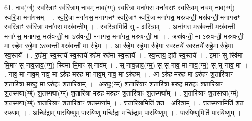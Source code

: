 \documentclass[17pt]{extarticle}
\begin{document}
61. नाव(ग्ग्॑) स्वरि॒त्राꣳ स्व॑रि॒त्राम् नाव॒म् नाव(ग्ग्॑) स्वरि॒त्रा मना॑गस॒ मना॑गसꣳ स्वरि॒त्राम् नाव॒म् नाव(ग्ग्॑) स्वरि॒त्रा मना॑गसम् । . स्व॒रि॒त्रा मना॑गस॒ मना॑गसꣳ स्वरि॒त्राꣳ स्व॑रि॒त्रा मना॑गस॒ मस्र॑वन्ती॒ मस्र॑वन्ती॒ मना॑गसꣳ स्वरि॒त्राꣳ स्व॑रि॒त्रा मना॑गस॒ मस्र॑वन्तीम् । . स्व॒रि॒त्रामिति॑ सु - अ॒रि॒त्राम् । . अना॑गस॒ मस्र॑वन्ती॒ मस्र॑वन्ती॒ मना॑गस॒ मना॑गस॒ मस्र॑वन्ती॒ मा ऽस्र॑वन्ती॒ मना॑गस॒ मना॑गस॒ मस्र॑वन्ती॒ मा । . अस्र॑वन्ती॒ मा ऽस्र॑वन्ती॒ मस्र॑वन्ती॒ मा रु॑हेम रुहे॒मा ऽस्र॑वन्ती॒ मस्र॑वन्ती॒ मा रु॑हेम । . आ रु॑हेम रुहे॒मा रु॑हेमा स्व॒स्तये᳚ स्व॒स्तये॑ रुहे॒मा रु॑हेमा स्व॒स्तये᳚ । . रु॒हे॒मा॒ स्व॒स्तये᳚ स्व॒स्तये॑ रुहेम रुहेमा स्व॒स्तये᳚ । . स्व॒स्तय॒ इति॑ स्व॒स्तये᳚ । . इ॒माꣳ सु स्वि॑मा मि॒माꣳ सु नाव॒न्नाव॒(ग्ग्॒) स्वि॑मा मि॒माꣳ सु नाव᳚म् । . सु नाव॒न्नाव॒(ग्म्॒) सु सु नाव॒ मा नाव॒(ग्म्॒) सु सु नाव॒ मा । . नाव॒ मा नाव॒म् नाव॒ मा ऽरु॑ह मरुह॒ मा नाव॒म् नाव॒ मा ऽरु॑हम् । . आ ऽरु॑ह मरुह॒ मा ऽरु॑हꣳ श॒तारि॑त्राꣳ श॒तारि॑त्रा मरुह॒ मा ऽरु॑हꣳ श॒तारि॑त्राम् । . अ॒रु॒ह॒(ग्म्॒) श॒तारि॑त्राꣳ श॒तारि॑त्रा मरुह मरुहꣳ श॒तारि॑त्राꣳ श॒तस्फ्या(ग्म्॑) श॒तस्फ्या(ग्म्॑) श॒तारि॑त्रा मरुह मरुहꣳ श॒तारि॑त्राꣳ श॒तस्फ्या᳚म् । . श॒तारि॑त्राꣳ श॒तस्फ्या(ग्म्॑) श॒तस्फ्या(ग्म्॑) श॒तारि॑त्राꣳ श॒तारि॑त्राꣳ श॒तस्फ्या᳚म् । . श॒तारि॑त्रा॒मिति॑ श॒त - अ॒रि॒त्रा॒म् । . श॒तस्फ्या॒मिति॑ श॒त - स्फ्या॒म् । . अच्छि॑द्राम् पारयि॒ष्णुम् पा॑रयि॒ष्णु मच्छि॑द्रा॒ मच्छि॑द्राम् पारयि॒ष्णुम् । . पा॒र॒यि॒ष्णुमिति॑ पारयि॒ष्णुम् । \newline
\pagebreak
\end{document}

